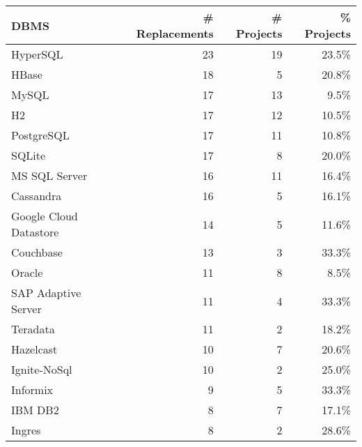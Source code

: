\begin{tabular}{lrrr}
\hline
        \textbf{DBMS} & \textbf{\# Replacements} & \textbf{\# Projects} & \textbf{\% Projects} \\
\hline
              HyperSQL &                       23 &                   19 &                23.5\% \\
                 HBase &                       18 &                    5 &                20.8\% \\
                 MySQL &                       17 &                   13 &                 9.5\% \\
                    H2 &                       17 &                   12 &                10.5\% \\
            PostgreSQL &                       17 &                   11 &                10.8\% \\
                SQLite &                       17 &                    8 &                20.0\% \\
         MS SQL Server &                       16 &                   11 &                16.4\% \\
             Cassandra &                       16 &                    5 &                16.1\% \\
Google Cloud Datastore &                       14 &                    5 &                11.6\% \\
             Couchbase &                       13 &                    3 &                33.3\% \\
                Oracle &                       11 &                    8 &                 8.5\% \\
   SAP Adaptive Server &                       11 &                    4 &                33.3\% \\
              Teradata &                       11 &                    2 &                18.2\% \\
             Hazelcast &                       10 &                    7 &                20.6\% \\
          Ignite-NoSql &                       10 &                    2 &                25.0\% \\
              Informix &                        9 &                    5 &                33.3\% \\
               IBM DB2 &                        8 &                    7 &                17.1\% \\
                Ingres &                        8 &                    2 &                28.6\% \\

\end{tabular}
